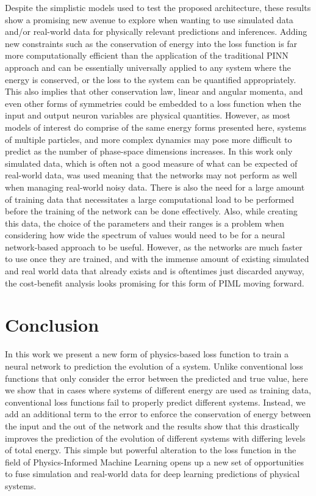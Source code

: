\documentclass[3p]{elsarticle}
\begin{document}
Despite the simplistic models used to test the proposed architecture, these results show a promising new avenue to explore when wanting to use simulated data and/or real-world data for physically relevant predictions and inferences. Adding new constraints such as the conservation of energy into the loss function is far more computationally efficient than the application of the traditional PINN approach and can be essentially universally applied to any system where the energy is conserved, or the loss to the system can be quantified appropriately. This also implies that other conservation law, linear and angular momenta, and even other forms of symmetries could be embedded to a loss function when the input and output neuron variables are physical quantities. However, as most models of interest do comprise of the same energy forms presented here, systems of multiple particles, and more complex dynamics may pose more difficult to predict as the number of phase-space dimensions increases. In this work only simulated data, which is often not a good measure of what can be expected of real-world data, was used meaning that the networks may not perform as well when managing real-world noisy data. There is also the need for a large amount of training data that necessitates a large computational load to be performed before the training of the network can be done effectively. Also, while creating this data, the choice of the parameters and their ranges is a problem when considering how wide the spectrum of values would need to be for a neural network-based approach to be useful. However, as the networks are much faster to use once they are trained, and with the immense amount of existing simulated and real world data that already exists and is oftentimes just discarded anyway, the cost-benefit analysis looks promising for this form of PIML moving forward.

\section{Conclusion}
In this work we present a new form of physics-based loss function to train a neural network to prediction the evolution of a system. Unlike conventional loss functions that only consider the error between the predicted and true value, here we show that in cases where systems of different energy are used as training data, conventional loss functions fail to properly predict different systems. Instead, we add an additional term to the error to enforce the conservation of energy between the input and the out of the network and the results show that this drastically improves the prediction of the evolution of different systems with differing levels of total energy. This simple but powerful alteration to the loss function in the field of Physics-Informed Machine Learning opens up a new set of opportunities to fuse simulation and real-world data for deep learning predictions of physical systems.


\end{document}
